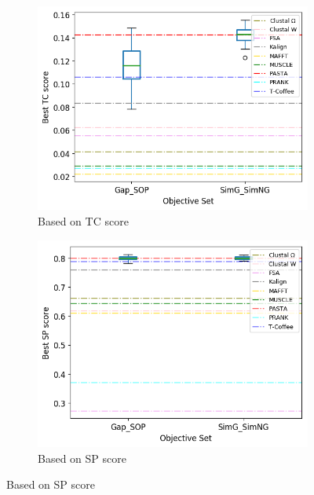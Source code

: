 \begin{figure}[!htbp]
\begin{adjustwidth}{-1.5cm}{-1.5cm}
\begin{subfigure}{0.75\columnwidth}
			\includegraphics[width=\columnwidth]{Figure/summary/precomputedInit/avg_objset_tc_rank}
			\caption{Based on TC score}
		\end{subfigure}
		\begin{subfigure}{0.75\columnwidth}
			\includegraphics[width=\columnwidth]{Figure/summary/precomputedInit/avg_objset_sp_rank}
			\caption{Based on SP score}
		\end{subfigure}

\end{adjustwidth}
\end{figure}
